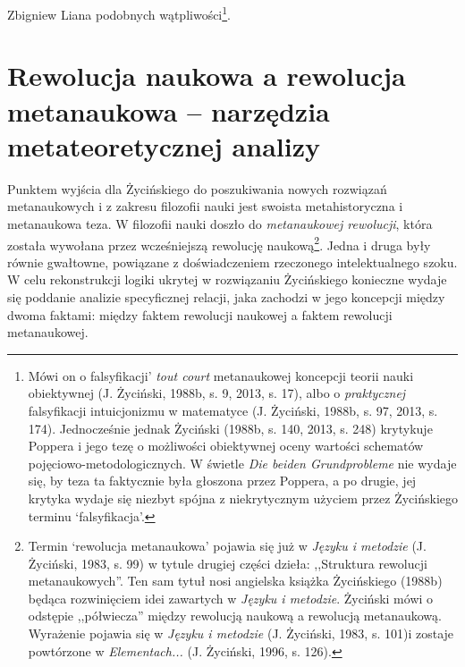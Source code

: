 \begin{artplenv}{Zbigniew Liana}
podobnych wątpliwości\footnote{Mówi on o falsyfikacji’ \textit{tout court} metanaukowej koncepcji teorii nauki
	obiektywnej \label{ref:RNDwQZn2Zd98X}(J. Życiński, 1988b, s. 9, 2013, s. 17), albo o \textit{praktycznej} falsyfikacji
	intuicjonizmu w matematyce \label{ref:RNDF7UBvcuK26}(J. Życiński, 1988b, s. 97, 2013, s. 174). Jednocześnie jednak
	Życiński \label{ref:RNDhVrobTs8jG}(1988b, s. 140, 2013, s. 248) krytykuje Poppera i jego tezę o możliwości obiektywnej
	oceny wartości schematów pojęciowo-metodologicznych. W świetle \textit{Die beiden Grundprobleme} nie wydaje się, by teza
	ta faktycznie była głoszona przez Poppera, a po drugie, jej krytyka wydaje się niezbyt spójna z niekrytycznym użyciem
	przez Życińskiego terminu ‘falsyfikacja’.}.

\section{Rewolucja naukowa a rewolucja metanaukowa -- narzędzia metateoretycznej analizy}

Punktem wyjścia dla Życińskiego do poszukiwania nowych rozwiązań metanaukowych i z zakresu filozofii nauki jest swoista
metahistoryczna i metanaukowa teza. W filozofii nauki doszło do \textit{metanaukowej rewolucji}, która została wywołana
przez wcześniejszą rewolucję naukową\footnote{Termin ‘rewolucja metanaukowa’ pojawia się już w \textit{Języku i metodzie
	}\label{ref:RNDX1VVM27OlW}(J. Życiński, 1983, s. 99) w tytule drugiej części dzieła: ,,Struktura rewolucji
	metanaukowych''. Ten sam tytuł nosi angielska książka Życińskiego \label{ref:RNDZhnNjGxqOR}(1988b) będąca rozwinięciem
	idei zawartych w \textit{Języku i metodzie}. Życiński mówi o odstępie ,,półwiecza'' między rewolucją naukową a rewolucją
	metanaukową. Wyrażenie pojawia się w \textit{Języku i metodzie} \label{ref:RNDIDOT0gvEdV}(J. Życiński, 1983, s. 101)i
	zostaje powtórzone w \textit{Elementach...}  \label{ref:RNDTq4UOwaMNQ}(J. Życiński, 1996, s. 126).}. Jedna i druga były
równie gwałtowne, powiązane z doświadczeniem rzeczonego intelektualnego szoku. W celu rekonstrukcji logiki ukrytej w
rozwiązaniu Życińskiego konieczne wydaje się poddanie analizie specyficznej relacji, jaka zachodzi w jego koncepcji
między dwoma faktami: między faktem rewolucji naukowej a faktem rewolucji metanaukowej.


\end{artplenv}
